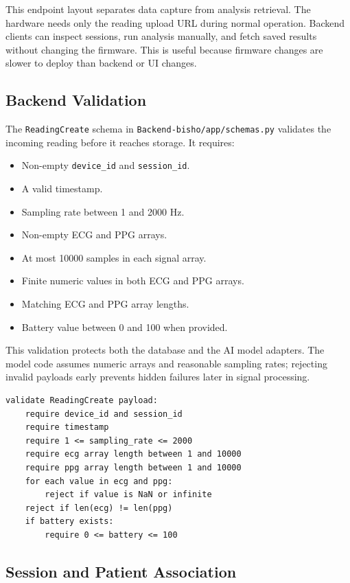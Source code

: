 This endpoint layout separates data capture from analysis retrieval. The hardware needs only the reading upload URL during normal operation. Backend clients can inspect sessions, run analysis manually, and fetch saved results without changing the firmware. This is useful because firmware changes are slower to deploy than backend or UI changes.

\subsection{Backend Validation}

The \texttt{ReadingCreate} schema in \texttt{Backend-bisho/app/schemas.py} validates the incoming reading before it reaches storage. It requires:

\begin{itemize}
    \item Non-empty \texttt{device\_id} and \texttt{session\_id}.
    \item A valid timestamp.
    \item Sampling rate between 1 and 2000 Hz.
    \item Non-empty ECG and PPG arrays.
    \item At most 10000 samples in each signal array.
    \item Finite numeric values in both ECG and PPG arrays.
    \item Matching ECG and PPG array lengths.
    \item Battery value between 0 and 100 when provided.
\end{itemize}

This validation protects both the database and the AI model adapters. The model code assumes numeric arrays and reasonable sampling rates; rejecting invalid payloads early prevents hidden failures later in signal processing.

\begin{lstlisting}[caption={Pseudocode for backend reading validation}]
validate ReadingCreate payload:
    require device_id and session_id
    require timestamp
    require 1 <= sampling_rate <= 2000
    require ecg array length between 1 and 10000
    require ppg array length between 1 and 10000
    for each value in ecg and ppg:
        reject if value is NaN or infinite
    reject if len(ecg) != len(ppg)
    if battery exists:
        require 0 <= battery <= 100
\end{lstlisting}

\subsection{Session and Patient Association}

